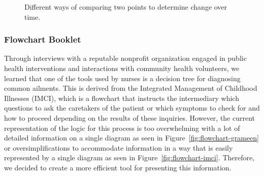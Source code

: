 \documentclass{sig-alternate}
\begin{document}
\begin{figure}%
    \centering
    \qquad
    \caption{Different ways of comparing two points to determine change over time.}%
    \label{fig:graph-changein}%
\end{figure}

\subsubsection{Flowchart Booklet}
Through interviews with a reputable nonprofit organization engaged in public health interventions and interactions with community health volunteers, we learned that one of the tools used by nurses is a decision tree for diagnosing common ailments. This is derived from the Integrated Management of Childhood Illnesses (IMCI), which is a flowchart that instructs the intermediary which questions to ask the caretakers of the patient or which symptoms to check for and how to proceed depending on the results of these inquiries. However, the current representation of the logic for this process is too overwhelming with a lot of detailed information on a single diagram as seen in Figure~\ref{fig:flowchart-grameen} or oversimplifications to accommodate information in a way that is easily represented by a single diagram as seen in Figure~\ref{fig:flowchart-imci}. Therefore, we decided to create a more efficient tool for presenting this information.
\end{document}
